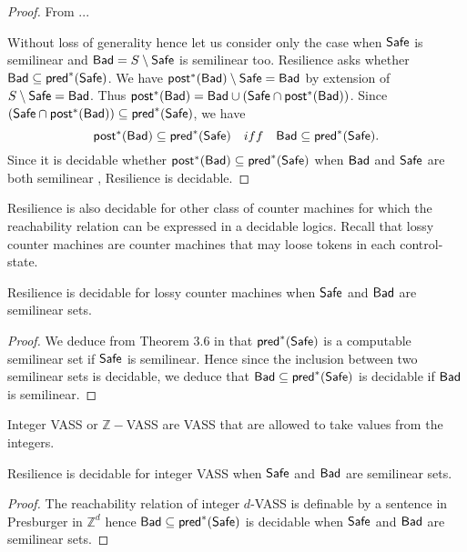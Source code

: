 \begin{proof}
 From \cite{DBLP:journals/corr/abs-2207-02697}...

Without loss of generality hence let us consider only the case when $\textsf{Safe}$ is semilinear
and $\textsf{Bad} = S \setminus \textsf{Safe}$ is semilinear too.
{\sc Resilience} asks whether $\textsf{Bad} \subseteq \textsf{pred}^*(\textsf{Safe})$.
We have $\textsf{post}^*(\textsf{Bad}) \setminus \textsf{Safe} = \textsf{Bad}$ by extension of $S \setminus \textsf{Safe} = \textsf{Bad}$.
Thus $\textsf{post}^*(\textsf{Bad}) = \textsf{Bad} \cup (\textsf{Safe} \cap \textsf{post}^*(\textsf{Bad}))$. Since $(\textsf{Safe} \cap \textsf{post}^*(\textsf{Bad})) \subseteq \textsf{pred}^*(\textsf{Safe})$, we have
$$\textsf{post}^*(\textsf{Bad}) \subseteq \textsf{pred}^*(\textsf{Safe}) \quad iff \quad \textsf{Bad} \subseteq \textsf{pred}^*(\textsf{Safe}).$$
Since it is decidable whether $\textsf{post}^*(\textsf{Bad}) \subseteq \textsf{pred}^*(\textsf{Safe})$ when 
$\textsf{Bad}$ and $\textsf{Safe}$ are both semilinear \cite{DBLP:journals/corr/abs-2207-02697}, 
{\sc Resilience} is decidable.
\end{proof}

Resilience is also decidable for other class of counter machines for which the reachability relation can be expressed in a decidable logics. Recall that lossy counter machines \cite{DBLP:conf/rp/Schnoebelen10} are counter machines that may loose tokens in each control-state.

\begin{theorem}{}
Resilience is decidable for lossy counter machines when $\textsf{Safe}$ and $\textsf{Bad}$ are semilinear sets.
\end{theorem}

\begin{proof}
We deduce from Theorem 3.6 in \cite{DBLP:conf/rp/Schnoebelen10} that $\textsf{pred}^*(\textsf{Safe})$ is a computable semilinear set if $\textsf{Safe}$ is semilinear. Hence since the inclusion between two semilinear sets is decidable, we deduce that $\textsf{Bad} \subseteq \textsf{pred}^*(\textsf{Safe})$ is decidable if $\textsf{Bad}$ is semilinear.
\end{proof}

Integer VASS or $\mathbb{Z}-$VASS \cite{DBLP:conf/rp/HaaseH14} are VASS that are allowed to take values from the integers.

\begin{theorem}{}
Resilience is decidable for integer VASS when $\textsf{Safe}$ and $\textsf{Bad}$ are semilinear sets.
\end{theorem}

\begin{proof}
The reachability relation of integer $d$-VASS is definable by a sentence in Presburger in $\mathbb{Z}^d$ hence	$\textsf{Bad} \subseteq \textsf{pred}^*(\textsf{Safe})$ is decidable when $\textsf{Safe}$ and $\textsf{Bad}$ are semilinear sets. 	
\end{proof}

